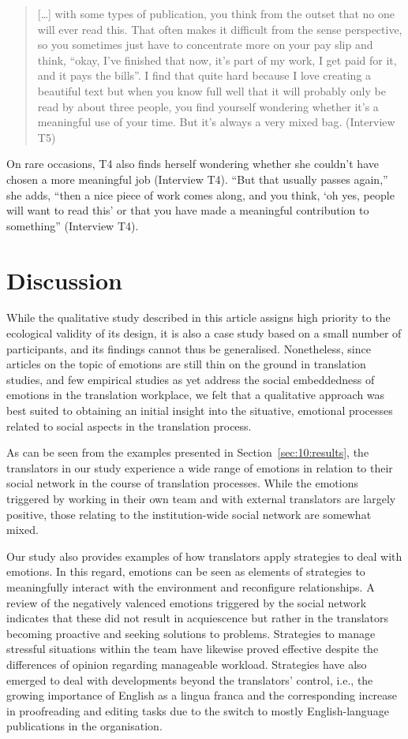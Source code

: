 \documentclass[output=paper]{langscibook}
\begin{document}
\begin{quote}
    […] with some types of publication, you think from the outset that no one will ever read this. That often makes it difficult from the sense perspective, so you sometimes just have to concentrate more on your pay slip and think, ``okay, I’ve finished that now, it’s part of my work, I get paid for it, and it pays the bills''. I find that quite hard because I love creating a beautiful text but when you know full well that it will probably only be read by about three people, you find yourself wondering whether it’s a meaningful use of your time. But it’s always a very mixed bag. (Interview T5)
\end{quote}

\noindent
On rare occasions, T4 also finds herself wondering whether she couldn’t have chosen a more meaningful job (Interview T4). “But that usually passes again,” she adds, “then a nice piece of work comes along, and you think, ‘oh yes, people will want to read this’ or that you have made a meaningful contribution to something” (Interview T4).

\section{Discussion}
While the qualitative study described in this article assigns high priority to the ecological validity of its design, it is also a case study based on a small number of participants, and its findings cannot thus be generalised. Nonetheless, since articles on the topic of emotions are still thin on the ground in translation studies, and few empirical studies as yet address the social embeddedness of emotions in the translation workplace, we felt that a qualitative approach was best suited to obtaining an initial insight into the situative, emotional processes related to social aspects in the translation process.

As can be seen from the examples presented in Section~\ref{sec:10:results}, the translators in our study experience a wide range of emotions in relation to their social network in the course of translation processes. While the emotions triggered by working in their own team and with external translators are largely positive, those relating to the institution-wide social network are somewhat mixed.

Our study also provides examples of how translators apply strategies to deal with emotions. In this regard, emotions can be seen as elements of strategies to meaningfully interact with the environment and reconfigure relationships. A review of the negatively valenced emotions triggered by the social network indicates that these did not result in acquiescence but rather in the translators becoming proactive and seeking solutions to problems. Strategies to manage stressful situations within the team have likewise proved effective despite the differences of opinion regarding manageable workload. Strategies have also emerged to deal with developments beyond the translators’ control, i.e., the growing importance of English as a lingua franca and the corresponding increase in proofreading and editing tasks due to the switch to mostly English-language publications in the organisation.
\end{document}
